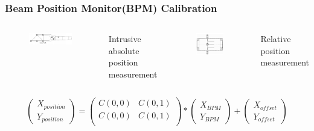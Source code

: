 \documentclass[12pt]{beamer}
\begin{document}
\begin{frame}
\frametitle{Beam Position Monitor(BPM) Calibration}

	\begin{columns}
		\begin{figure}
			\includegraphics[width=5.5cm]{../images/Thesis/harp.png}
		\end{figure}
		Intrusive absolute position measurement
		\vspace{-15pt}
		\begin{figure}
			\includegraphics[width=3.5cm]{../images/Thesis/BPM.png}
		\end{figure}
		\vspace{-15pt}
		Relative position measurement
			
	\end{columns}	
		\centering
		\begin{equation}
			\begin{pmatrix}
			X_{position}\\
			Y_{position}
			\end{pmatrix}
			=
			\begin{pmatrix}
			C(0,0) & C(0,1)\\
			C(0,0) & C(0,1)\\
			\end{pmatrix}
			*
			\begin{pmatrix}
			X_{BPM}\\
			Y_{BPM}
			\end{pmatrix}
			+
			\begin{pmatrix}
			X_{offset}\\
			Y_{offset}
			\end{pmatrix}
			\nonumber			 
		\end{equation}
		
\end{frame}
\end{document}
